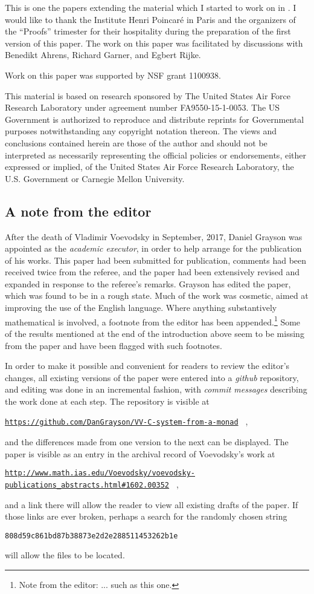 \documentclass[onecolumn,12pt]{amsart}
\numberwithin{proposition}{subsection}
\newcommand{\editorfootnote}[1]{\footnote{Note from the editor: #1}}
\begin{document}
This is one the papers extending the material which I started to work on in
\cite{NTS}. I would like to thank the Institute Henri Poincar\'e in Paris and the
organizers of the ``Proofs'' trimester for their hospitality during the
preparation of the first version of this paper. The work on this paper was
facilitated by discussions with Benedikt Ahrens, Richard Garner, and Egbert
Rijke.

Work on this paper was supported by NSF grant 1100938.

This material is based on research sponsored by The United States Air
  Force Research Laboratory under agreement number FA9550-15-1-0053. The US
  Government is authorized to reproduce and distribute reprints for
  Governmental purposes notwithstanding any copyright notation thereon.
The views and conclusions contained herein are those of the author and should
not be interpreted as necessarily representing the official policies or
endorsements, either expressed or implied, of the United States Air Force
Research Laboratory, the U.S. Government or Carnegie Mellon University.

\subsection{A note from the editor}

After the death of Vladimir Voevodsky in
September, 2017, Daniel Grayson was appointed as the {\em academic executor},
in order to help arrange for the publication of his works.  This paper had been
submitted for publication, comments had been received twice from the referee,
and the paper had been extensively revised and expanded in response to the
referee's remarks.  Grayson has edited the paper, which was found
to be in a rough state.  Much of the work was cosmetic, aimed at improving the
use of the English language.  Where anything substantively mathematical is
involved, a footnote from the editor has been appended.\editorfootnote{... such
  as this one.}  Some of the results mentioned at the end of the introduction above
seem to be missing from the paper and have been flagged with such footnotes.

In order to make it possible and convenient for readers to review the editor's
changes, all existing versions of the paper were entered into a {\em github}
repository, and editing was done in an incremental fashion, with {\em commit
  messages} describing the work done at each step.  The repository is visible
at
\hfill\break\centerline{\tiny{\tt \href{https://github.com/DanGrayson/VV-C-system-from-a-monad}{https://github.com/DanGrayson/VV-C-system-from-a-monad}%
  } ,}
and the differences made from one version to the next can be displayed.
The paper is visible as an entry in the archival record of Voevodsky's work at
\hfill\break\centerline{\tiny{\tt \href{http://www.math.ias.edu/Voevodsky/voevodsky-publications\_abstracts.html\#1602.00352}{http://www.math.ias.edu/Voevodsky/voevodsky-publications\_abstracts.html\#1602.00352}%
  } ,}
and a link there will allow the reader to view all existing drafts of the paper.
If those links are ever broken, perhaps a search for the randomly chosen string
\hfill\break\centerline{\tiny{\tt 808d59c861bd87b38873e2d2e288511453262b1e}}
will allow the files to be located.
\end{document}
